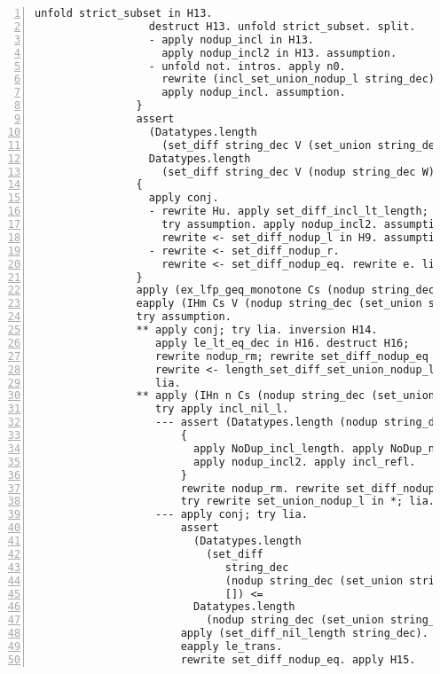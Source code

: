 \begin{lstlisting}[language=Coq, label={lst:thm_32_full_proof}, caption={Full proof of Theorem 3.2 in Coq}, numbers=left]
                  unfold strict_subset in H13.
                  destruct H13. unfold strict_subset. split.
                  - apply nodup_incl in H13.
                    apply nodup_incl2 in H13. assumption.
                  - unfold not. intros. apply n0.
                    rewrite (incl_set_union_nodup_l string_dec).
                    apply nodup_incl. assumption.
                }
                assert
                  (Datatypes.length
                    (set_diff string_dec V (set_union string_dec (nodup string_dec W) U)) <
                  Datatypes.length
                    (set_diff string_dec V (nodup string_dec W)) <= S m).
                {
                  apply conj.
                  - rewrite Hu. apply set_diff_incl_lt_length;
                    try assumption. apply nodup_incl2. assumption.
                    rewrite <- set_diff_nodup_l in H9. assumption.
                  - rewrite <- set_diff_nodup_r.
                    rewrite <- set_diff_nodup_eq. rewrite e. lia.
                }
                apply (ex_lfp_geq_monotone Cs (nodup string_dec V) h' f).
                eapply (IHm Cs V (nodup string_dec (set_union string_dec W U)) h');
                try assumption.
                ** apply conj; try lia. inversion H14.
                   apply le_lt_eq_dec in H16. destruct H16;
                   rewrite nodup_rm; rewrite set_diff_nodup_eq in *;
                   rewrite <- length_set_diff_set_union_nodup_l;
                   lia.
                ** apply (IHn n Cs (nodup string_dec (set_union string_dec W U)) [] h');
                   try apply incl_nil_l.
                   --- assert (Datatypes.length (nodup string_dec V) <= Datatypes.length V).
                       {
                         apply NoDup_incl_length. apply NoDup_nodup.
                         apply nodup_incl2. apply incl_refl.
                       }
                       rewrite nodup_rm. rewrite set_diff_nodup_eq in *;
                       try rewrite set_union_nodup_l in *; lia.
                   --- apply conj; try lia.
                       assert
                         (Datatypes.length
                           (set_diff
                              string_dec
                              (nodup string_dec (set_union string_dec W U))
                              []) <=
                         Datatypes.length
                           (nodup string_dec (set_union string_dec W U))).
                       apply (set_diff_nil_length string_dec).
                       eapply le_trans.
                       rewrite set_diff_nodup_eq. apply H15.

\end{lstlisting}
